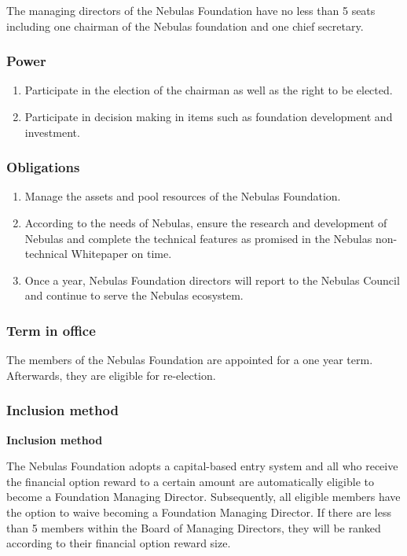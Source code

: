 The managing directors of the Nebulas Foundation have no less than 5 seats including one chairman of the Nebulas foundation and one chief secretary.

\subsubsection{Power}

\begin{enumerate}
	\item Participate in the election of the chairman as well as the right to be elected.
	\item Participate in decision making in items such as foundation development and investment.
\end{enumerate}

\subsubsection{Obligations}

\begin{enumerate}
	\item Manage the assets and pool resources of the Nebulas Foundation.
	\item According to the needs of Nebulas, ensure the research and development of Nebulas and complete the technical features as promised in the Nebulas non-technical Whitepaper on time.
	\item Once a year, Nebulas Foundation directors will report to the Nebulas Council and continue to serve the Nebulas ecosystem.
\end{enumerate}

\subsubsection{Term in office}

The members of the Nebulas Foundation are appointed for a one year term. Afterwards, they are eligible for re-election.

\subsubsection{Inclusion method}

\textbf{Inclusion method}

The Nebulas Foundation adopts a capital-based entry system and all who receive the financial option reward to a certain amount are automatically eligible to become a Foundation Managing Director. Subsequently, all eligible members have the option to waive becoming a Foundation Managing Director. If there are less than 5 members within the Board of Managing Directors, they will be ranked according to their financial option reward size.

